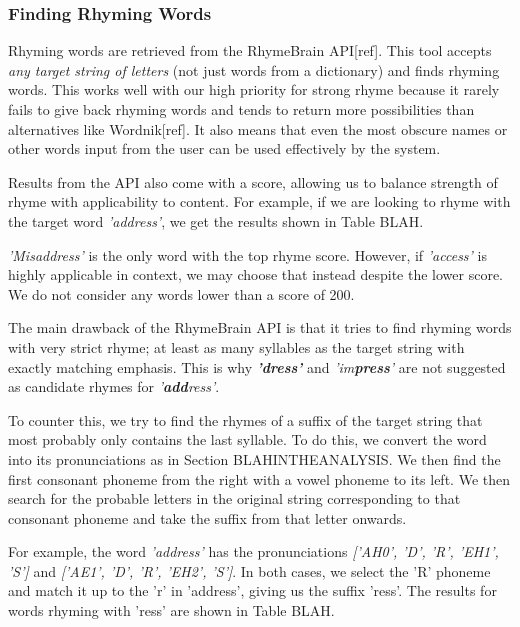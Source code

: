 \subsubsection{Finding Rhyming Words}
\label{sec:rhymebrain}
Rhyming words are retrieved from the RhymeBrain API[ref]. This tool accepts \textit{any target string of letters} (not just words from a dictionary) and finds rhyming words. This works well with our high priority for strong rhyme because it rarely fails to give back rhyming words and tends to return more possibilities than alternatives like Wordnik[ref]. It also means that even the most obscure names or other words input from the user can be used effectively by the system.

Results from the API also come with a score, allowing us to balance strength of rhyme with applicability to content. For example, if we are looking to rhyme with the target word \textit{'address'}, we get the results shown in Table BLAH.


\textit{'Misaddress'} is the only word with the top rhyme score. However, if \textit{'access'} is highly applicable in context, we may choose that instead despite the lower score. We do not consider any words lower than a score of 200.

The main drawback of the RhymeBrain API is that it tries to find rhyming words with very strict rhyme; at least as many syllables as the target string with exactly matching emphasis. This is why \textbf{\textit{'dress'}} and \textit{'im\textbf{press}'} are not suggested as candidate rhymes for \textit{'\textbf{add}ress'}.

To counter this, we try to find the rhymes of a suffix of the target string that most probably only contains the last syllable. To do this, we convert the word into its pronunciations as in Section BLAHINTHEANALYSIS. We then find the first consonant phoneme from the right with a vowel phoneme to its left. We then search for the probable letters in the original string corresponding to that consonant phoneme and take the suffix from that letter onwards.

For example, the word \textit{'address'} has the pronunciations \textit{['AH0', 'D', 'R', 'EH1', 'S']} and \textit{['AE1', 'D', 'R', 'EH2', 'S']}. In both cases, we select the 'R' phoneme and match it up to the 'r' in 'address', giving us the suffix 'ress'. The results for words rhyming with 'ress' are shown in Table BLAH.

